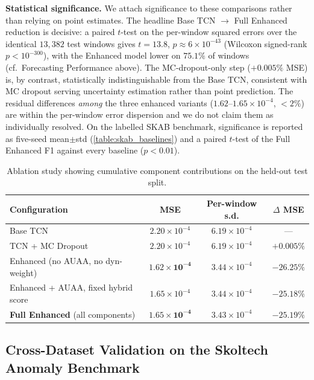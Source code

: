 \textbf{Statistical significance.} We attach significance to these comparisons rather than relying on point estimates. The headline Base TCN $\to$ Full Enhanced reduction is decisive: a paired $t$-test on the per-window squared errors over the identical $13{,}382$ test windows gives $t=13.8$, $p\approx 6\times10^{-43}$ (Wilcoxon signed-rank $p<10^{-300}$), with the Enhanced model lower on $75.1\%$ of windows (cf.\ Forecasting Performance above). The MC-dropout-only step ($+0.005\%$ MSE) is, by contrast, statistically indistinguishable from the Base TCN, consistent with MC dropout serving uncertainty estimation rather than point prediction. The residual differences \emph{among} the three enhanced variants ($1.62$--$1.65\times10^{-4}$, $<2\%$) are within the per-window error dispersion and we do not claim them as individually resolved. On the labelled SKAB benchmark, significance is reported as five-seed mean$\pm$std (\cref{table:skab_baselines}) and a paired $t$-test of the Full Enhanced F1 against every baseline ($p<0.01$).

\begin{table}[H]
\centering
\caption{Ablation study showing cumulative component contributions on the held-out test split.}
\label{table:ablation}
\begin{tabular}{lccc}
\toprule
\textbf{Configuration} & \textbf{MSE} & \textbf{Per-window s.d.} & \textbf{$\Delta$ MSE} \\
\midrule
Base TCN                              & $2.20\times 10^{-4}$ & $6.19\times 10^{-4}$ & --- \\
TCN + MC Dropout                      & $2.20\times 10^{-4}$ & $6.19\times 10^{-4}$ & $+0.005\%$ \\
Enhanced (no AUAA, no dyn-weight)     & $\mathbf{1.62\times 10^{-4}}$ & $3.44\times 10^{-4}$ & $\mathbf{-26.25\%}$ \\
Enhanced + AUAA, fixed hybrid score   & $1.65\times 10^{-4}$ & $3.44\times 10^{-4}$ & $-25.18\%$ \\
\textbf{Full Enhanced} (all components) & $\mathbf{1.65\times 10^{-4}}$ & $3.43\times 10^{-4}$ & $\mathbf{-25.19\%}$ \\
\bottomrule
\end{tabular}
\end{table}

\subsection{Cross-Dataset Validation on the Skoltech Anomaly Benchmark}
\label{sec:skab_cross_dataset}


